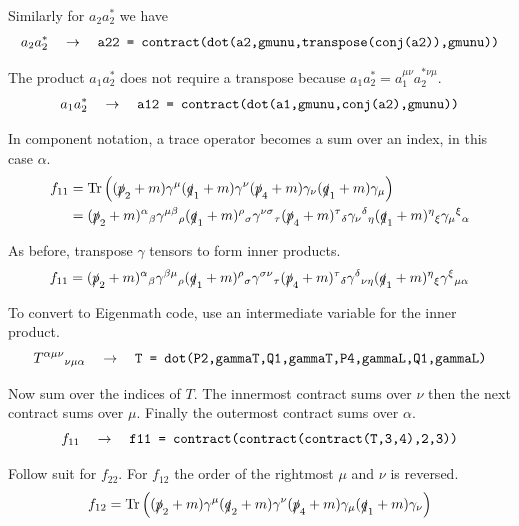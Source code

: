 \documentclass[12pt]{article}
\begin{document}
\noindent
Similarly for $a_2a_2^*$ we have
\begin{equation*}
a_2a_2^*
\quad\rightarrow\quad
\text{\tt a22 = contract(dot(a2,gmunu,transpose(conj(a2)),gmunu))}
\end{equation*}

\noindent
The product $a_1a_2^*$ does not require a transpose because $a_1a_2^*=a_1^{\mu\nu}a_2^{*\nu\mu}$.
\begin{equation*}
a_1a_2^*
\quad\rightarrow\quad
\text{\tt a12 = contract(dot(a1,gmunu,conj(a2),gmunu))}
\end{equation*}

\noindent
In component notation, a trace operator becomes a sum over an index, in this case $\alpha$.
\begin{align*}
f_{11}
&=
\mathop{\rm Tr}
\left(
(\slashed{p}_2+m)\gamma^\mu(\slashed{q}_1+m)\gamma^\nu(\slashed{p}_4+m)\gamma_\nu(\slashed{q}_1+m)\gamma_\mu
\right)\\
&=
(\slashed{p}_2+m)^\alpha{}_\beta
\gamma^{\mu\beta}{}_\rho
(\slashed{q}_1+m)^\rho{}_\sigma
\gamma^{\nu\sigma}{}_\tau
(\slashed{p}_4+m)^\tau{}_\delta
\gamma_\nu{}^\delta{}_\eta
(\slashed{q}_1+m)^\eta{}_\xi
\gamma_\mu{}^\xi{}_\alpha
\end{align*}

\noindent
As before, transpose $\gamma$ tensors to form inner products.
\begin{equation*}
f_{11}=
(\slashed{p}_2+m)^\alpha{}_\beta
\gamma^{\beta\mu}{}_\rho
(\slashed{q}_1+m)^\rho{}_\sigma
\gamma^{\sigma\nu}{}_\tau
(\slashed{p}_4+m)^\tau{}_\delta
\gamma^\delta{}_{\nu\eta}
(\slashed{q}_1+m)^\eta{}_\xi
\gamma^\xi{}_{\mu\alpha}
\end{equation*}

\noindent
To convert to Eigenmath code, use an intermediate variable for the inner product.
\begin{equation*}
T^{\alpha\mu\nu}{}_{\nu\mu\alpha}
\quad\rightarrow\quad
\text{\tt T = dot(P2,gammaT,Q1,gammaT,P4,gammaL,Q1,gammaL)}
\end{equation*}

\noindent
Now sum over the indices of $T$.
The innermost contract sums over $\nu$ then the next contract sums over $\mu$.
Finally the outermost contract sums over $\alpha$.
\begin{equation*}
f_{11}\quad\rightarrow\quad
\text{\tt f11 = contract(contract(contract(T,3,4),2,3))}
\end{equation*}

\noindent
Follow suit for $f_{22}$.
For $f_{12}$ the order of the rightmost $\mu$ and $\nu$ is reversed.
\begin{equation*}
f_{12}=\mathop{\rm Tr}
\left(
(\slashed{p}_2+m)\gamma^\mu(\slashed{q}_2+m)\gamma^\nu(\slashed{p}_4+m)\gamma_\mu(\slashed{q}_1+m)\gamma_\nu
\right)
\end{equation*}
\end{document}
